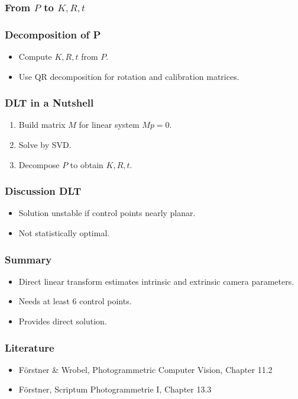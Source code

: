 \begin{frame}
  \frametitle{From $P$ to $K,R,t$}
\end{frame}

\begin{frame}
  \frametitle{Decomposition of P}
  \begin{itemize}
    \item Compute $K, R, t$ from $P$.
    \item Use QR decomposition for rotation and calibration matrices.
  \end{itemize}
\end{frame}

\begin{frame}
  \frametitle{DLT in a Nutshell}
  \begin{enumerate}
    \item Build matrix $M$ for linear system $M p = 0$.
    \item Solve by SVD.
    \item Decompose $P$ to obtain $K,R,t$.
  \end{enumerate}
\end{frame}

\begin{frame}
  \frametitle{Discussion DLT}
  \begin{itemize}
    \item Solution unstable if control points nearly planar.
    \item Not statistically optimal.
  \end{itemize}
\end{frame}

\begin{frame}
  \frametitle{Summary}
  \begin{itemize}
    \item Direct linear transform estimates intrinsic and extrinsic camera parameters.
    \item Needs at least 6 control points.
    \item Provides direct solution.
  \end{itemize}
\end{frame}

\begin{frame}
  \frametitle{Literature}
  \begin{itemize}
    \item Förstner \& Wrobel, Photogrammetric Computer Vision, Chapter 11.2
    \item Förstner, Scriptum Photogrammetrie I, Chapter 13.3
  \end{itemize}
\end{frame}

